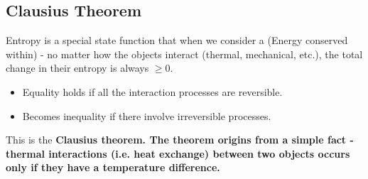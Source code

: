\documentclass[class=article, crop=false, 12pt]{standalone}
\begin{document}



\subsection{Clausius Theorem}

Entropy is a special state function that when we consider a  (Energy conserved within) -
no matter how the objects interact (thermal, mechanical, etc.),
the total change in their entropy is always $\geq 0$.
\begin{itemize}
    \item Equality holds if all the interaction processes are reversible.
    \item Becomes inequality if there involve irreversible processes.
\end{itemize}

This is the \bf{Clausius theorem}. 
The theorem origins from a simple fact - 
thermal interactions (i.e. heat exchange) between two objects occurs only if they have a temperature difference.
\end{document}
